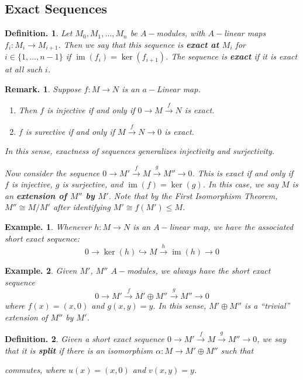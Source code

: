 \documentclass[11pt, a4paper]{memoir}
\newcommand{\fto}[1]{\ensuremath{\xrightarrow{\scriptstyle{#1}}}}
\newcommand{\hto}[0]{\ensuremath{\hookrightarrow}}
\theoremstyle{change}
\theoremstyle{plain}
\theoremstyle{nonumberplain}
\newtheorem{definition}{Definition.}
\newtheorem{example}{Example.}
\newtheorem{remark}{Remark.}
\DeclareMathOperator{\im}{im}
\numberwithin{equation}{section}
\begin{document}
\subsection{Exact Sequences}
\begin{definition}
    Let $M_0,M_1,\ldots,M_n$ be $A-$modules, with $A-$linear maps $f_i:M_i\to M_{i+1}$.
    Then we say that this sequence is \textbf{exact at $M_i$} for $i\in\{1,\ldots,n-1\}$ if $\im(f_i)=\ker(f_{i+1})$.
    The sequence is \textbf{exact} if it is exact at all such $i$.
\end{definition}
\begin{remark}
    Suppose $f:M\to N$ is an $a-$Linear map.
    \begin{enumerate}[nolistsep]
        \item Then $f$ is injective if and only if $0\to M\fto{f} N$ is exact.
        \item $f$ is surective if and only if $M\fto{f}N\to 0$ is exact.
    \end{enumerate}
    In this sense, exactness of sequences generalizes injectivity and surjectivity.

    Now consider the sequence $0\to M'\fto{f}M\fto{g} M''\to 0$.
    This is exact if and only if $f$ is injective, $g$ is surjective, and $\im(f)=\ker(g)$.
    In this case, we say $M$ is an \textbf{extension of $M''$ by $M'$}.
    Note that by the First Isomorphism Theorem, $M''\cong M/M'$ after identifying $M'\cong f(M')\leq M$.
\end{remark}
\begin{example}
    Whenever $h:M\to N$ is an $A-$linear map, we have the associated short exact sequence:
    \begin{equation*}
        0\to\ker(h)\hto M\fto{h}\im(h)\to 0
    \end{equation*}
\end{example}
\begin{example}
    Given $M'$, $M''$ $A-$modules, we always have the short exact sequence
    \begin{equation*}
        0\to M'\fto{f}M'\oplus M''\fto{g}M''\to 0
    \end{equation*}
    where $f(x)=(x,0)$ and $g(x,y)=y$.
    In this sense, $M'\oplus M''$ is a ``trivial'' extension of $M''$ by $M'$.
\end{example}
\begin{definition}
    Given a short exact sequence $0\to M'\fto{f} M\fto{g} M''\to 0$, we say that it is \textbf{split} if there is an isomorphism $\alpha:M\to M'\oplus M''$ such that
    \begin{center}
    \end{center}
    commutes, where $u(x)=(x,0)$ and $v(x,y)=y$.
\end{definition}
\end{document}
